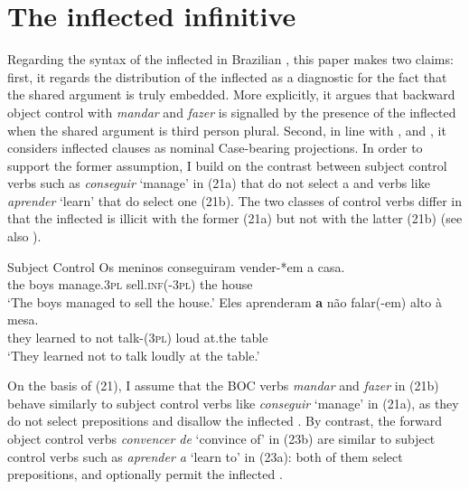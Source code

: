 \documentclass[output=paper]{langsci/langscibook}
\begin{document}
\section{The inflected infinitive}%

Regarding the syntax of the inflected  in Brazilian , this paper makes two claims: first, it regards the distribution of the inflected  as a diagnostic for the fact that the shared argument is truly embedded. More explicitly, it argues that backward object control with \textit{mandar} and \textit{fazer} is signalled by the presence of the inflected  when the shared argument is third person plural. Second, in line with \citet{Raposo1987}, \citet{Nunes1995} and \citet{Pires2007}, it considers inflected  clauses as nominal Case-bearing projections. In order to support the former assumption, I build on the contrast between subject control verbs such as \textit{conseguir} ‘manage’ in (21a) that do not select a  and verbs like \textit{aprender} ‘learn’ that do select one (21b). The two classes of control verbs differ in that the inflected  is illicit with the former (21a) but not with the latter (21b) (see also \citealt{Modesto2010}). 

\ea%
         Subject Control\label{ex:moreno:21}
    \ea  
    \gll Os meninos conseguiram   vender-*em   a casa.  \\
         the boys      manage.\textsc{3pl}    sell\textsc{.inf(-3pl)}  the house\\
    \glt ‘The boys managed to sell the house.’
    \ex  
    \gll Eles    aprenderam \textbf{a}  não   falar(-em)     alto  à        mesa.     \\
         they    learned        to not    talk-(\textsc{3pl})  loud at.the table  \\
    \glt ‘They learned not to talk loudly at the table.’
    \z
\z

On the basis of (21), I assume that the BOC verbs \textit{mandar} and \textit{fazer} in (21b) behave similarly to subject control verbs like \textit{conseguir} ‘manage’ in (21a), as they do not select prepositions and disallow the inflected . By contrast, the forward object control verbs \textit{convencer de} ‘convince of’ in (23b) are similar to subject control verbs such as \textit{aprender a} ‘learn to’ in (23a): both of them select prepositions, and optionally permit the inflected .
\end{document}
